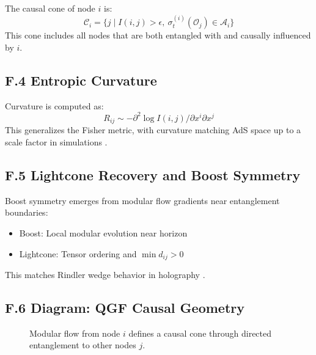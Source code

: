 \documentclass[11pt]{article}
\def\frac#1#2{#1/#2}
\begin{document}
The causal cone of node \( i \) is:
\[
\mathcal{C}_i = \{ j \mid I(i,j) > \epsilon, \ \sigma_t^{(i)}(\mathcal{O}_j) \in \mathcal{A}_i \}
\]
This cone includes all nodes that are both entangled with and causally influenced by \( i \).

\subsection*{F.4 Entropic Curvature}

Curvature is computed as:
\[
R_{ij} \sim -\frac{\partial^2 \log I(i,j)}{\partial x^i \partial x^j}
\]
This generalizes the Fisher metric, with curvature matching AdS space up to a scale factor in simulations .

\subsection*{F.5 Lightcone Recovery and Boost Symmetry}

Boost symmetry emerges from modular flow gradients near entanglement boundaries:
\begin{itemize}
  \item Boost: Local modular evolution near horizon
  \item Lightcone: Tensor ordering and \( \min d_{ij} > 0 \)
\end{itemize}

This matches Rindler wedge behavior in holography  .

\subsection*{F.6 Diagram: QGF Causal Geometry}

\begin{figure}[H]
\centering
{}
\caption{Modular flow from node \( i \) defines a causal cone through directed entanglement to other nodes \( j \).}
\label{fig:modular-causal-cone}
\end{figure}
\end{document}
